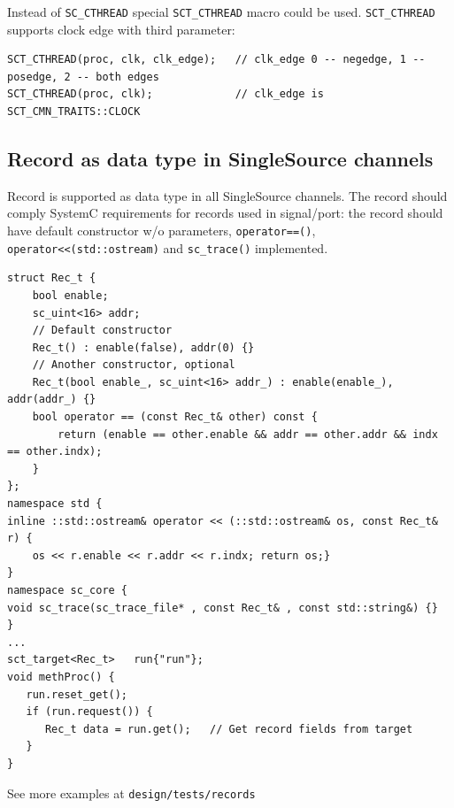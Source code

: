 Instead of {\tt SC\_CTHREAD} special {\tt SCT\_CTHREAD} macro could be used. {\tt SCT\_CTHREAD} supports clock edge with third parameter:

\begin{lstlisting}[style=mycpp]
SCT_CTHREAD(proc, clk, clk_edge);   // clk_edge 0 -- negedge, 1 -- posedge, 2 -- both edges
SCT_CTHREAD(proc, clk);             // clk_edge is SCT_CMN_TRAITS::CLOCK
\end{lstlisting}

\subsection{Record as data type in SingleSource channels}

Record is supported as data type in all SingleSource channels. The record should comply SystemC requirements for records used in signal/port: the record should have default constructor w/o parameters, {\tt operator==()}, {\tt operator<<(std::ostream)} and {\tt sc\_trace()} implemented.

\begin{lstlisting}[style=mycpp]
struct Rec_t {
    bool enable;
    sc_uint<16> addr;
    // Default constructor
    Rec_t() : enable(false), addr(0) {}
    // Another constructor, optional
    Rec_t(bool enable_, sc_uint<16> addr_) : enable(enable_), addr(addr_) {}    
    bool operator == (const Rec_t& other) const {
        return (enable == other.enable && addr == other.addr && indx == other.indx);
    }
};
namespace std {
inline ::std::ostream& operator << (::std::ostream& os, const Rec_t& r) {
    os << r.enable << r.addr << r.indx; return os;}
}
namespace sc_core {
void sc_trace(sc_trace_file* , const Rec_t& , const std::string&) {}
}
...
sct_target<Rec_t>   run{"run"};
void methProc() {
   run.reset_get();
   if (run.request()) {
      Rec_t data = run.get();   // Get record fields from target
   }
}
\end{lstlisting}

See more examples at {\tt design/tests/records}

\begin{lstlisting}[style=mycpp]
\end{lstlisting}
